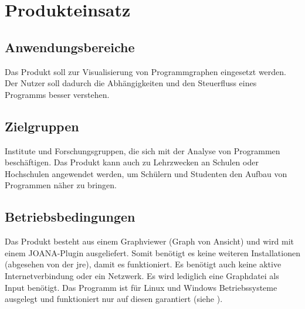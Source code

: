 \chapter{Produkteinsatz}

\section{Anwendungsbereiche}
Das Produkt soll zur Visualisierung von Programmgraphen eingesetzt werden. Der Nutzer soll dadurch die Abhängigkeiten und den Steuerfluss eines Programms besser verstehen.

\section{Zielgruppen}
Institute und Forschungsgruppen, die sich mit der Analyse von Programmen beschäftigen. Das Produkt kann auch zu Lehrzwecken an Schulen oder Hochschulen angewendet werden, um Schülern und Studenten den Aufbau von Programmen näher zu bringen. %

\section{Betriebsbedingungen}
Das Produkt besteht aus einem Graphviewer (Graph von Ansicht) und wird mit einem JOANA-Plugin ausgeliefert. Somit benötigt es keine weiteren Installationen (abgesehen von der \gls{jre}), damit es funktioniert. Es benötigt auch keine aktive Internetverbindung oder ein Netzwerk. Es wird lediglich eine Graphdatei als Input benötigt. Das Programm ist für Linux und Windows Betriebssysteme ausgelegt und funktioniert nur auf diesen garantiert (siehe ).
